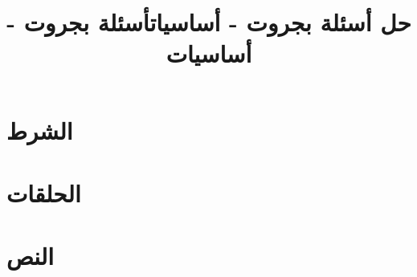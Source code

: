 \documentclass[12pt]{article}
\title{حل أسئلة بجروت - أساسيات}
\title{أسئلة بجروت - أساسيات}
\begin{document}
\maketitle
\renewcommand{\contentsname}{جدول المحتويات}
\tableofcontents
\clearpage

\clearpage
\section{الشرط}





\clearpage
\section{الحلقات}

















\clearpage
\section{النص}



\clearpage
\end{document}
